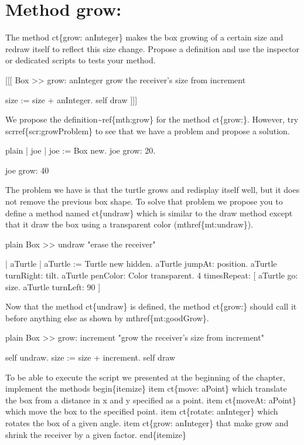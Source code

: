 \documentclass[10pt,twoside,english]{_support/latex/sbabook/sbabook}
\begin{document}
\section{Method grow:}
 The method ct\{grow: anInteger\} makes the box growing of a certain size and redraw itself to reflect this size change.  Propose a definition and  use the inspector or dedicated scripts to tests your method. 

 {[}{[}{[}
Box \textgreater{}\textgreater{} grow: anInteger 
   grow the receiver's size from increment
   
    size := size + anInteger.
    self draw
{]}{]}{]}

We propose the definition\textasciitilde{}ref\{mth:grow\} for the method ct\{grow:\}.
However, try scrref\{scr:growProblem\} to see that we have a problem and 
propose a solution.

\begin{displaycode}{plain}
| joe |
joe := Box new.
joe grow: 20.

joe grow: 40
\end{displaycode}

The problem we have is that the turtle grows and redisplay itself  well, but it does not remove the previous box shape. To solve that 
problem we propose you to define a method named ct\{undraw\} which  is similar to the draw method except that it draw the box using a 
transparent color (mthref\{mt:undraw\}).

\begin{displaycode}{plain}
Box >> undraw
   "erase the receiver"
   
   | aTurtle |
   aTurtle := Turtle new hidden.
   aTurtle jumpAt: position.
   aTurtle turnRight: tilt.
   aTurtle penColor: Color transparent.
   4 timesRepeat: [ aTurtle go: size.
                  aTurtle turnLeft: 90 ]
\end{displaycode}

Now that the method ct\{undraw\} is defined, the method ct\{grow:\} should 
call it before anything else as shown by mthref\{mt:goodGrow\}.

\begin{displaycode}{plain}
Box >> grow: increment 
   "grow the receiver's size from increment"

   self undraw.
   size := size + increment.
   self draw
\end{displaycode}

To be able to execute the script we presented at the beginning of the chapter, implement the methods
begin\{itemize\}
item  ct\{move: aPoint\} which translate the box 
from a distance in x and y specified as a point. 
item ct\{moveAt: aPoint\} which move the box to the specified point.
item ct\{rotate: anInteger\} which rotates the box of a given angle. 
item ct\{grow: anInteger\} 
that make grow and shrink the receiver by a given factor.
end\{itemize\}
\end{document}
